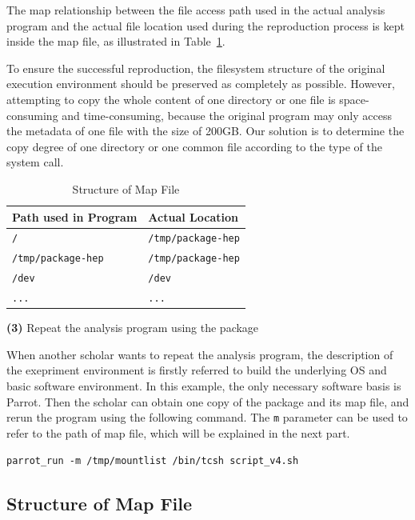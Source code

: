 \documentclass{acm_proc_article-sp}
\begin{document}
The map relationship between the file access path used in the actual analysis
program and the actual file location used during the reproduction process is
kept inside the map file, as illustrated in Table~\ref{table:map-file}.

To ensure the successful reproduction, the filesystem structure of the original
execution environment should be preserved as completely as possible. However,
attempting to copy the whole content of one directory or one file is
space-consuming and time-consuming, because the original program may only
access the metadata of one file with the size of 200GB. Our solution is to
determine the copy degree of one directory or one common file according to the
type of the system call.


\begin{table}
    \centering
    \begin{tabular}{|l|l|}
    \hline
    \bf Path used in Program & \bf Actual Location \\ \hline
    {\tt /} & {\tt /tmp/package-hep} \\ \hline
    {\tt /tmp/package-hep} & {\tt /tmp/package-hep} \\ \hline
    {\tt /dev} & {\tt /dev} \\ \hline
    {\tt ...} & {\tt ...}\\ \hline
    \end{tabular}
    \caption{Structure of Map File}
    \label{table:map-file}
\end{table}

{\bf (3)} Repeat the analysis program using the package

When another scholar wants to repeat the analysis program, 
the description of the exepriment environment is firstly referred to build the underlying OS and basic software environment. In this example, the only necessary software basis is Parrot. Then the scholar can obtain one copy of the package and its map file, and rerun the program using the following command. The {\tt m} parameter can be used to refer to the path of map file, which will be explained in the next part.

{\tt parrot\_run -m /tmp/mountlist /bin/tcsh script\_v4.sh}

\subsection{Structure of Map File} 
\end{document}
